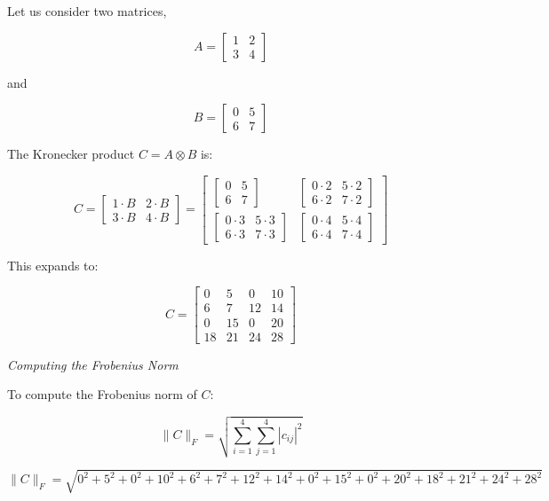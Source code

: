 \documentclass[
  letterpaper,
  DIV=11,
  numbers=noendperiod]{scrreprt}
\theoremstyle{plain}
\theoremstyle{definition}
\theoremstyle{remark}
\begin{document}
Let us consider two matrices,

\[A = \begin{bmatrix}
1 & 2 \\
3 & 4
\end{bmatrix}\]

and

\[B = \begin{bmatrix}
0 & 5 \\
6 & 7
\end{bmatrix}\]

The Kronecker product \(C = A \otimes B\) is:

\[C = \begin{bmatrix}
1 \cdot B & 2 \cdot B \\
3 \cdot B & 4 \cdot B
\end{bmatrix}
= \begin{bmatrix}
\begin{bmatrix}
0 & 5 \\
6 & 7
\end{bmatrix} & \begin{bmatrix}
0 \cdot 2 & 5 \cdot 2 \\
6 \cdot 2 & 7 \cdot 2
\end{bmatrix} \\
\begin{bmatrix}
0 \cdot 3 & 5 \cdot 3 \\
6 \cdot 3 & 7 \cdot 3
\end{bmatrix} & \begin{bmatrix}
0 \cdot 4 & 5 \cdot 4 \\
6 \cdot 4 & 7 \cdot 4
\end{bmatrix}
\end{bmatrix}\]

This expands to:

\[C = \begin{bmatrix}
0 & 5 & 0 & 10 \\
6 & 7 & 12 & 14 \\
0 & 15 & 0 & 20 \\
18 & 21 & 24 & 28
\end{bmatrix}\]

\emph{Computing the Frobenius Norm}

To compute the Frobenius norm of \(C\):

\[\|C\|_F = \sqrt{\sum_{i=1}^{4} \sum_{j=1}^{4} |c_{ij}|^2}\]

\[\|C\|_F = \sqrt{0^2 + 5^2 + 0^2 + 10^2 + 6^2 + 7^2 + 12^2 + 14^2 + 0^2 + 15^2 + 0^2 + 20^2 + 18^2 + 21^2 + 24^2 + 28^2}\]
\end{document}
